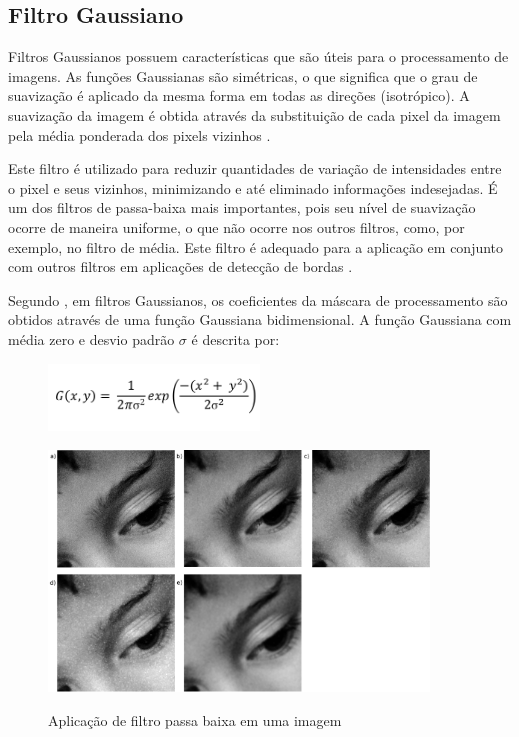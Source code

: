 \documentclass[
	12pt,				%
	oneside,			%
	a4paper,			%
	english,			%
	french,				%
	spanish,			%
	brazil,				%
	]{abntex2}
\begin{document}
\subsection{Filtro Gaussiano}
Filtros Gaussianos possuem características que são úteis para o processamento de imagens. As funções Gaussianas são simétricas, o que significa que o grau de suavização é aplicado da mesma forma em todas as direções (isotrópico). A suavização da imagem é obtida através da substituição de cada pixel da imagem pela média ponderada dos pixels vizinhos \cite{pedriniSchwartz:2008}. 

Este filtro é utilizado para reduzir quantidades de variação de intensidades entre o pixel e seus vizinhos, minimizando e até eliminado informações indesejadas. É um dos filtros de passa-baixa mais importantes, pois seu nível de suavização ocorre de maneira uniforme, o que não ocorre nos outros filtros, como, por exemplo, no filtro de média. Este filtro é adequado para a aplicação em conjunto com outros filtros em aplicações de detecção de bordas \cite{conciAzevedoLeta:2008}.   

Segundo \citet{pedriniSchwartz:2008}, em filtros Gaussianos, os coeficientes da máscara de processamento são obtidos através de uma função Gaussiana bidimensional. A função Gaussiana com média zero e desvio padrão \(\sigma\) é descrita por:

\begin{figure}[ht]
\centering
\includegraphics[width=0.5\textwidth]{imagens/gauss_formula.png}
\end{figure}

\begin{figure}[h]
\centering
\caption{Aplicação de filtro passa baixa em uma imagem}
\includegraphics[width=0.9\textwidth]{imagens/suavizacao.png}
\sourceAuthor
\label{fig:suavizacao}
\end{figure}
\end{document}
